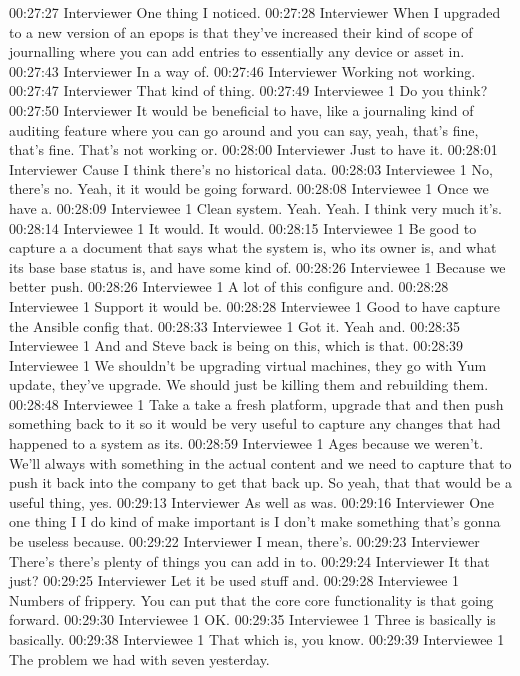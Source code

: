 00:27:27 Interviewer
One thing I noticed.
00:27:28 Interviewer
When I upgraded to a new version of an epops is that they've increased their kind of scope of journalling where you can add entries to essentially any device or asset in.
00:27:43 Interviewer
In a way of.
00:27:46 Interviewer
Working not working.
00:27:47 Interviewer
That kind of thing.
00:27:49 Interviewee 1
Do you think?
00:27:50 Interviewer
It would be beneficial to have, like a journaling kind of auditing feature where you can go around and you can say, yeah, that's fine, that's fine. That's not working or.
00:28:00 Interviewer
Just to have it.
00:28:01 Interviewer
Cause I think there's no historical data.
00:28:03 Interviewee 1
No, there's no. Yeah, it it would be going forward.
00:28:08 Interviewee 1
Once we have a.
00:28:09 Interviewee 1
Clean system. Yeah. Yeah. I think very much it's.
00:28:14 Interviewee 1
It would. It would.
00:28:15 Interviewee 1
Be good to capture a a document that says what the system is, who its owner is, and what its base base status is, and have some kind of.
00:28:26 Interviewee 1
Because we better push.
00:28:26 Interviewee 1
A lot of this configure and.
00:28:28 Interviewee 1
Support it would be.
00:28:28 Interviewee 1
Good to have capture the Ansible config that.
00:28:33 Interviewee 1
Got it. Yeah and.
00:28:35 Interviewee 1
And and Steve back is being on this, which is that.
00:28:39 Interviewee 1
We shouldn't be upgrading virtual machines, they go with Yum update, they've upgrade. We should just be killing them and rebuilding them.
00:28:48 Interviewee 1
Take a take a fresh platform, upgrade that and then push something back to it so it would be very useful to capture any changes that had happened to a system as its.
00:28:59 Interviewee 1
Ages because we weren't. We'll always with something in the actual content and we need to capture that to push it back into the company to get that back up. So yeah, that that would be a useful thing, yes.
00:29:13 Interviewer
As well as was.
00:29:16 Interviewer
One one thing I I do kind of make important is I don't make something that's gonna be useless because.
00:29:22 Interviewer
I mean, there's.
00:29:23 Interviewer
There's there's plenty of things you can add in to.
00:29:24 Interviewer
It that just?
00:29:25 Interviewer
Let it be used stuff and.
00:29:28 Interviewee 1
Numbers of frippery. You can put that the core core functionality is that going forward.
00:29:30 Interviewee 1
OK.
00:29:35 Interviewee 1
Three is basically is basically.
00:29:38 Interviewee 1
That which is, you know.
00:29:39 Interviewee 1
The problem we had with seven yesterday.
